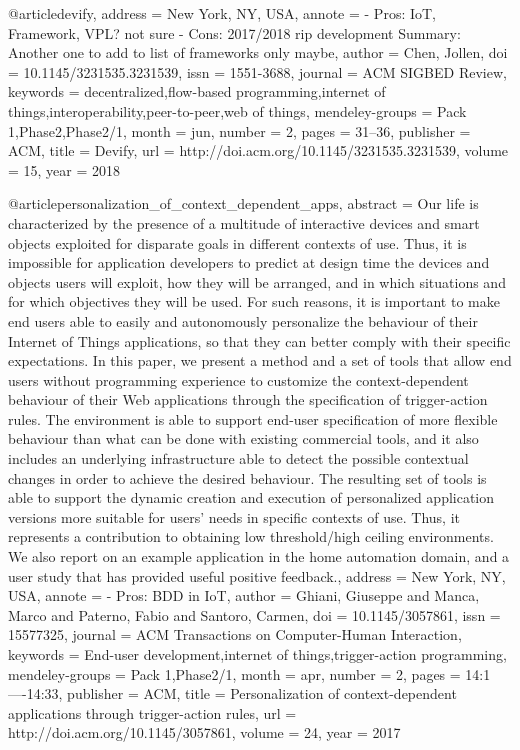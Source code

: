 @article{devify,
    address = {New York, NY, USA},
    annote = {- Pros: IoT, Framework, VPL? not sure
    - Cons: 2017/2018 rip development
    Summary: Another one to add to list of frameworks only maybe},
    author = {Chen, Jollen},
    doi = {10.1145/3231535.3231539},
    issn = {1551-3688},
    journal = {ACM SIGBED Review},
    keywords = {decentralized,flow-based programming,internet of things,interoperability,peer-to-peer,web of things},
    mendeley-groups = {Pack 1,Phase2,Phase2/1},
    month = {jun},
    number = {2},
    pages = {31--36},
    publisher = {ACM},
    title = {{Devify}},
    url = {http://doi.acm.org/10.1145/3231535.3231539},
    volume = {15},
    year = {2018}
}

@article{personalization_of_context_dependent_apps,
    abstract = {Our life is characterized by the presence of a multitude of interactive devices and smart objects exploited for disparate goals in different contexts of use. Thus, it is impossible for application developers to predict at design time the devices and objects users will exploit, how they will be arranged, and in which situations and for which objectives they will be used. For such reasons, it is important to make end users able to easily and autonomously personalize the behaviour of their Internet of Things applications, so that they can better comply with their specific expectations. In this paper, we present a method and a set of tools that allow end users without programming experience to customize the context-dependent behaviour of their Web applications through the specification of trigger-action rules. The environment is able to support end-user specification of more flexible behaviour than what can be done with existing commercial tools, and it also includes an underlying infrastructure able to detect the possible contextual changes in order to achieve the desired behaviour. The resulting set of tools is able to support the dynamic creation and execution of personalized application versions more suitable for users' needs in specific contexts of use. Thus, it represents a contribution to obtaining low threshold/high ceiling environments. We also report on an example application in the home automation domain, and a user study that has provided useful positive feedback.},
    address = {New York, NY, USA},
    annote = {- Pros: BDD in IoT},
    author = {Ghiani, Giuseppe and Manca, Marco and Paterno, Fabio and Santoro, Carmen},
    doi = {10.1145/3057861},
    issn = {15577325},
    journal = {ACM Transactions on Computer-Human Interaction},
    keywords = {End-user development,internet of things,trigger-action programming},
    mendeley-groups = {Pack 1,Phase2/1},
    month = {apr},
    number = {2},
    pages = {14:1----14:33},
    publisher = {ACM},
    title = {{Personalization of context-dependent applications through trigger-action rules}},
    url = {http://doi.acm.org/10.1145/3057861},
    volume = {24},
    year = {2017}
}

